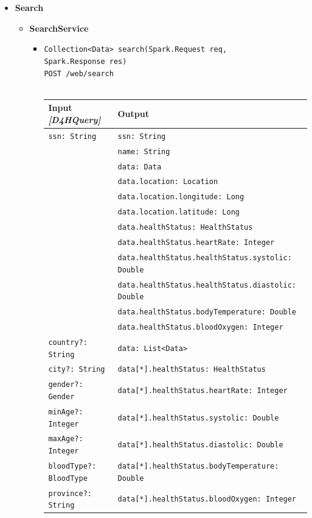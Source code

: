 \documentclass[a4paper, hidelinks, 12pt]{report}
\begin{document}
\begin{itemize}
			\item{\textbf{Search}}
			\begin{itemize}
				\item{\textbf{SearchService}}
				\begin{itemize}
			\item{\verb|Collection<Data> search(Spark.Request req,|\\ \verb|Spark.Response res)|\\ \verb|POST /web/search|}\\\\
			\begin{tabular}{l | l}
			\textbf{Input} \textit{[D4HQuery]} & \textbf{Output} \\
			\hline
				\verb|ssn: String| & \verb|ssn: String| \\
				& \verb|name: String| \\
				& \verb|data: Data| \\
				& \verb|data.location: Location| \\
				& \verb|data.location.longitude: Long| \\
				& \verb|data.location.latitude: Long| \\
				& \verb|data.healthStatus: HealthStatus| \\
				& \verb|data.healthStatus.heartRate: Integer| \\
				& \verb|data.healthStatus.healthStatus.systolic: Double| \\
				& \verb|data.healthStatus.healthStatus.diastolic: Double| \\
				& \verb|data.healthStatus.bodyTemperature: Double| \\
				& \verb|data.healthStatus.bloodOxygen: Integer| \\
			\hline
				\verb|country?: String| & \verb|data: List<Data>| \\
				\verb|city?: String| & \verb|data[*].healthStatus: HealthStatus| \\
				\verb|gender?: Gender| & \verb|data[*].healthStatus.heartRate: Integer| \\
				\verb|minAge?: Integer| & \verb|data[*].healthStatus.systolic: Double| \\
				\verb|maxAge?: Integer| & \verb|data[*].healthStatus.diastolic: Double| \\
				\verb|bloodType?: BloodType| & \verb|data[*].healthStatus.bodyTemperature: Double| \\
				\verb|province?: String| & \verb|data[*].healthStatus.bloodOxygen: Integer| \\
			\end{tabular}\\
		\end{itemize}	
						

\end{itemize}
\end{itemize}
\end{document}
